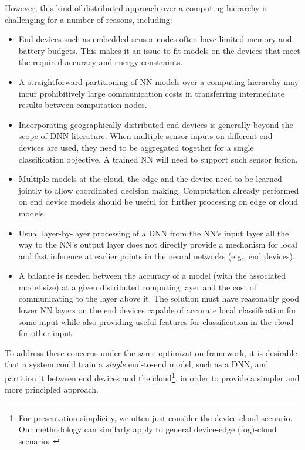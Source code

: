\documentclass[10pt, conference, compsocconf]{IEEEtran}
\begin{document}
However, this kind of distributed approach over a computing hierarchy is challenging for a number of reasons, including:


\begin{itemize}

    \item End devices such as embedded sensor nodes often have limited memory and battery budgets. This makes it an issue to fit models on the devices that meet the required accuracy and energy constraints.
    
    \item A straightforward partitioning of NN models over a computing hierarchy may incur prohibitively large communication costs in transferring intermediate results between computation nodes.
    
    \item Incorporating geographically distributed end devices is generally beyond the scope of DNN literature. When multiple sensor inputs on different end devices are used, they need to be aggregated together for a single classification objective. A trained NN will need to support such sensor fusion.
    
    \item Multiple models at the cloud, the edge and the device need to be learned jointly to allow coordinated decision making. Computation already performed on end device models should be useful for further processing on edge or cloud models.
        
    \item Usual layer-by-layer processing of a DNN from the NN's input layer all the way to the NN's output layer does not directly provide a mechanism for local and fast inference at earlier points in the neural networks (e.g., end devices).
        
    \item A balance is needed between the accuracy of a model (with the associated model size) at a given distributed computing layer and the cost of communicating to the layer above it. The solution must have reasonably good lower NN layers on the end devices capable of accurate local classification for some input while also providing useful features for classification in the cloud for other input. 
    
     
    
\end{itemize}

To address these concerns under the same optimization framework, it is desirable that a system could train a \textit{single} end-to-end model, such as a DNN, and partition it between end devices and the cloud\footnote{For presentation simplicity, we often just consider the device-cloud scenario. Our methodology can similarly apply to general device-edge (fog)-cloud scenarios.}, in order to provide a simpler and more principled approach.
\end{document}
